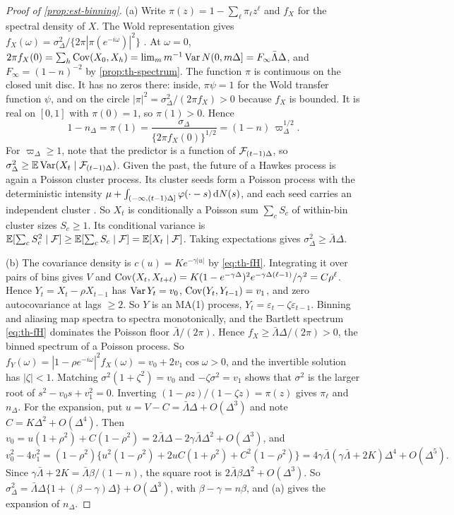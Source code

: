 \begin{proof}[Proof of \cref{prop:est-binning}]
(a) Write $\pi(z)=1-\sum_\ell\pi_\ell z^\ell$ and $f_X$ for the spectral density of $X$.
The Wold representation gives $f_X(\omega)=\sigma^2_\Delta/\{2\pi|\pi(e^{-i\omega})|^2\}$
\citep[Ch.~5]{brockwell1991}. At $\omega=0$,
$2\pi f_X(0)=\sum_h\operatorname{Cov}(X_0,X_h)=\lim_m m^{-1}\operatorname{Var} N(0,m\Delta]=F_\infty\bar\Lambda\Delta$,
and $F_\infty=(1-n)^{-2}$ by \cref{prop:th-spectrum}. The function $\pi$ is continuous
on the closed unit disc. It has no zeros there: inside, $\pi\psi=1$ for the Wold transfer
function $\psi$, and on the circle $|\pi|^2=\sigma^2_\Delta/(2\pi f_X)>0$ because $f_X$ is
bounded. It is real on $[0,1]$ with $\pi(0)=1$, so $\pi(1)>0$. Hence
\[
  1-n_\Delta=\pi(1)=\frac{\sigma_\Delta}{\{2\pi f_X(0)\}^{1/2}}=(1-n)\,\varpi_\Delta^{1/2}.
\]
For $\varpi_\Delta\ge1$, note that the predictor is a function of $\mathcal{F}_{(t-1)\Delta}$,
so $\sigma^2_\Delta\ge\mathbb{E}\operatorname{Var}(X_t\mid\mathcal{F}_{(t-1)\Delta})$. Given the past, the future of a
Hawkes process is again a Poisson cluster process. Its cluster seeds form a Poisson
process with the deterministic intensity
$\mu+\int_{(-\infty,(t-1)\Delta]}\varphi(\cdot-s)\,\mathrm{d}N(s)$, and each seed carries an
independent cluster \citep{hawkes1974}. So $X_t$ is conditionally a Poisson sum
$\sum_cS_c$ of within-bin cluster sizes $S_c\ge1$. Its conditional variance is
$\mathbb{E}[\sum_cS_c^2\mid\mathcal{F}]\ge\mathbb{E}[\sum_cS_c\mid\mathcal{F}]=\mathbb{E}[X_t\mid\mathcal{F}]$. Taking expectations
gives $\sigma^2_\Delta\ge\bar\Lambda\Delta$.

(b) The covariance density is $c(u)=Ke^{-\gamma|u|}$ by \eqref{eq:th-fH}. Integrating it
over pairs of bins gives $V$ and $\operatorname{Cov}(X_t,X_{t+\ell})=K(1-e^{-\gamma\Delta})^2e^{-\gamma\Delta(\ell-1)}/\gamma^2=C\rho^\ell$.
Hence $Y_t=X_t-\rho X_{t-1}$ has $\operatorname{Var} Y_t=v_0$, $\operatorname{Cov}(Y_t,Y_{t-1})=v_1$, and zero
autocovariance at lags $\ge2$. So $Y$ is an MA(1) process, $Y_t=\varepsilon_t-\zeta\varepsilon_{t-1}$.
Binning and aliasing map spectra to spectra monotonically, and the Bartlett spectrum
\eqref{eq:th-fH} dominates the Poisson floor $\bar\Lambda/(2\pi)$. Hence
$f_X\ge\bar\Lambda\Delta/(2\pi)>0$, the binned spectrum of a Poisson process. So
$f_Y(\omega)=|1-\rho e^{-i\omega}|^2f_X(\omega)=v_0+2v_1\cos\omega>0$, and the invertible
solution has $|\zeta|<1$. Matching $\sigma^2(1+\zeta^2)=v_0$ and $-\zeta\sigma^2=v_1$ shows
that $\sigma^2$ is the larger root of $s^2-v_0s+v_1^2=0$. Inverting
$(1-\rho z)/(1-\zeta z)=\pi(z)$ gives $\pi_\ell$ and $n_\Delta$. For the expansion, put
$u=V-C=\bar\Lambda\Delta+O(\Delta^3)$ and note $C=K\Delta^2+O(\Delta^4)$. Then
$v_0=u(1+\rho^2)+C(1-\rho^2)=2\bar\Lambda\Delta-2\gamma\bar\Lambda\Delta^2+O(\Delta^3)$, and
\[
  v_0^2-4v_1^2=(1-\rho^2)\{u^2(1-\rho^2)+2uC(1+\rho^2)+C^2(1-\rho^2)\}
  =4\gamma\bar\Lambda(\gamma\bar\Lambda+2K)\Delta^4+O(\Delta^5).
\]
Since $\gamma\bar\Lambda+2K=\bar\Lambda\beta/(1-n)$, the square root is
$2\bar\Lambda\beta\Delta^2+O(\Delta^3)$. So
$\sigma^2_\Delta=\bar\Lambda\Delta\{1+(\beta-\gamma)\Delta\}+O(\Delta^3)$, with
$\beta-\gamma=n\beta$, and (a) gives the expansion of $n_\Delta$.
\end{proof}

